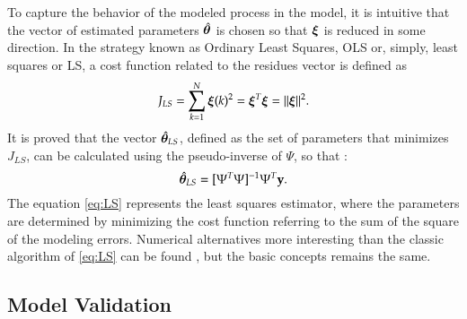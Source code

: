To capture the behavior of the modeled process in the model, it is intuitive that the vector of estimated parameters $\hat{\bm{\theta}}$ is chosen so that $\bm{\xi}$ is reduced in some direction. In the strategy known as Ordinary Least Squares, OLS or, simply, least squares or LS, a cost function related to the residues vector is defined as
\begin{equation}
   \label{eq:JLS}
   J_{LS} = \sum_{k=1}^{N} \bm{\xi}(k)^2 = \bm{\xi}^T\bm{\xi} = ||\bm{\xi}||^2.
\end{equation}
It is proved that the vector $\hat{\bm{\theta}}_{LS}$, defined as the set of parameters that minimizes $J_{LS}$, can be calculated using the pseudo-inverse of $\Psi$, so that \citep{aguirre2015}:
\begin{equation}
   \hat{\bm{\theta}}_{LS} = [\Psi^T \Psi]^{-1}\Psi^T \mathrm{\mathbf{y}}.
   \label{eq:LS}
\end{equation}
The equation \ref{eq:LS} represents the least squares estimator, where the parameters are determined by minimizing the cost function referring to the sum of the square of the modeling errors.
Numerical alternatives more interesting than the classic algorithm of \eqref{eq:LS} can be found \citep{aguirre2015, ljung1999}, but the basic concepts remains the same.


\subsection{Model Validation}\label{sec:model_validation}

